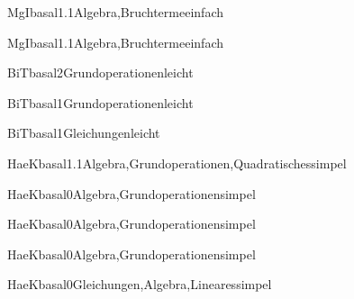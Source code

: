 \documentclass[12pt]{article}
\begin{document}
\begin{Add}{MgI}{basal1.1}{Algebra,Bruchterme}{einfach}
\end{Add}

\begin{Add}{MgI}{basal1.1}{Algebra,Bruchterme}{einfach}
\end{Add}



\begin{Add}{BiT}{basal2}{Grundoperationen}{leicht}
\end{Add}

\begin{Add}{BiT}{basal1}{Grundoperationen}{leicht}

\end{Add}

\begin{Add}{BiT}{basal1}{Gleichungen}{leicht}
      
\end{Add}


\begin{Add}{HaeK}{basal1.1}{Algebra,Grundoperationen,Quadratisches}{simpel}
\end{Add}

\begin{Add}{HaeK}{basal0}{Algebra,Grundoperationen}{simpel}
\end{Add}

\begin{Add}{HaeK}{basal0}{Algebra,Grundoperationen}{simpel}
\end{Add}

\begin{Add}{HaeK}{basal0}{Algebra,Grundoperationen}{simpel}
\end{Add}

\begin{Add}{HaeK}{basal0}{Gleichungen,Algebra,Lineares}{simpel}
      
\end{Add}
\end{document}
